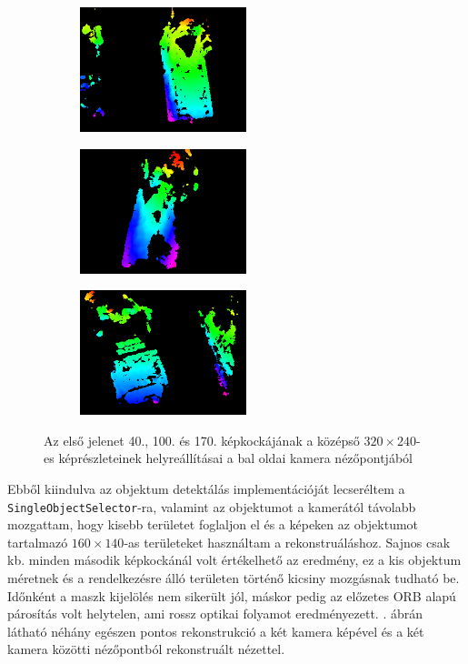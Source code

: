 \begin{figure}[tbh]
\centering
\begin{subfigure}[b]{.32\linewidth}
	\centering
	\includegraphics[width=137pt]{figures/vis_93_320.png}
  \end{subfigure}
\begin{subfigure}[b]{.32\linewidth}
	\centering
	\includegraphics[width=137pt]{figures/vis_152_320.png}
  \end{subfigure}
\begin{subfigure}[b]{.32\linewidth}
	\centering
	\includegraphics[width=137pt]{figures/vis_223_320.png}
  \end{subfigure}
\caption{Az első jelenet 40., 100. és 170. képkockájának a középső $320\times 240$-es képrészleteinek helyreállításai a bal oldai kamera nézőpontjából \label{fig:cut_320_240}}
\end{figure}

Ebből kiindulva az objektum detektálás implementációját lecseréltem a \texttt{SingleObjectSelector}-ra, valamint az objektumot a kamerától távolabb mozgattam, hogy kisebb területet foglaljon el és a képeken az objektumot tartalmazó $160\times 140$-as területeket használtam a rekonstruáláshoz. Sajnos csak kb. minden második képkockánál volt értékelhető az eredmény, ez a kis objektum méretnek és a rendelkezésre álló területen történő kicsiny mozgásnak tudható be. Időnként a maszk kijelölés nem sikerült jól, máskor pedig az előzetes ORB alapú párosítás volt helytelen, ami rossz optikai folyamot eredményezett. . ábrán látható néhány egészen pontos rekonstrukció a két kamera képével és a két kamera közötti nézőpontból rekonstruált nézettel.

